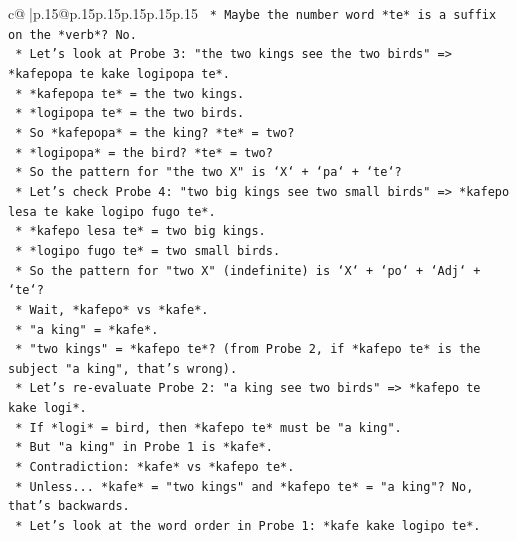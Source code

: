 \documentclass{article}
\begin{document}
{\begin{supertabular}{c@{$\;$}|p{.15\linewidth}@{}p{.15\linewidth}p{.15\linewidth}p{.15\linewidth}p{.15\linewidth}p{.15\linewidth}}
{{{\texttt{                *   Maybe the number word *te* is a suffix on the *verb*? No.} \\
\texttt{                *   Let's look at Probe 3: "the two kings see the two birds" => *kafepopa te kake logipopa te*.} \\
\texttt{                    *   *kafepopa te* = the two kings.} \\
\texttt{                    *   *logipopa te* = the two birds.} \\
\texttt{                    *   So *kafepopa* = the king? *te* = two?} \\
\texttt{                    *   *logipopa* = the bird? *te* = two?} \\
\texttt{                    *   So the pattern for "the two X" is `X` + `pa` + `te`?} \\
\texttt{                    *   Let's check Probe 4: "two big kings see two small birds" => *kafepo lesa te kake logipo fugo te*.} \\
\texttt{                        *   *kafepo lesa te* = two big kings.} \\
\texttt{                        *   *logipo fugo te* = two small birds.} \\
\texttt{                        *   So the pattern for "two X" (indefinite) is `X` + `po` + `Adj` + `te`?} \\
\texttt{                        *   Wait, *kafepo* vs *kafe*.} \\
\texttt{                        *   "a king" = *kafe*.} \\
\texttt{                        *   "two kings" = *kafepo te*? (from Probe 2, if *kafepo te* is the subject "a king", that's wrong).} \\
\texttt{                        *   Let's re{-}evaluate Probe 2: "a king see two birds" => *kafepo te kake logi*.} \\
\texttt{                            *   If *logi* = bird, then *kafepo te* must be "a king".} \\
\texttt{                            *   But "a king" in Probe 1 is *kafe*.} \\
\texttt{                            *   Contradiction: *kafe* vs *kafepo te*.} \\
\texttt{                            *   Unless... *kafe* = "two kings" and *kafepo te* = "a king"? No, that's backwards.} \\
\texttt{                            *   Let's look at the word order in Probe 1: *kafe kake logipo te*.} \\
}}}
\end{supertabular}}
\end{document}
